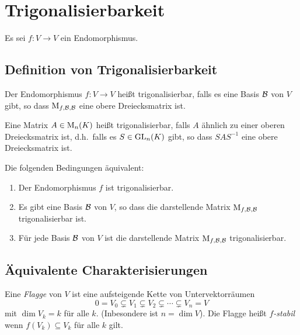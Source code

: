 





\section{Trigonalisierbarkeit}

Es sei $f \colon V \to V$ ein Endomorphismus.



\subsection{Definition von Trigonalisierbarkeit}



\begin{definition}
  Der Endomorphismus $f \colon V \to V$ heißt trigonalisierbar, falls es eine Basis $\mathcal{B}$ von $V$ gibt, so dass $\operatorname{M}_{f, \mathcal{B}, \mathcal{B}}$ eine obere Dreiecksmatrix ist.
  
  Eine Matrix $A \in \operatorname{M}_{n}(K)$ heißt trigonalisierbar, falls $A$ ähnlich zu einer oberen Dreiecksmatrix ist, d.h.\ falls es $S \in \operatorname{GL}_{n}(K)$ gibt, so dass $S A S^{-1}$ eine obere Dreiecksmatrix ist.
\end{definition}

\begin{lemma}
  Die folgenden Bedingungen äquivalent:
  \begin{enumerate}
    \item
      Der Endomorphismus $f$ ist trigonalisierbar.
    \item
      Es gibt eine Basis $\mathcal{B}$ von $V$, so dass die darstellende Matrix $\operatorname{M}_{f, \mathcal{B}, \mathcal{B}}$ trigonalisierbar ist.
    \item
      Für jede Basis $\mathcal{B}$ von $V$ ist die darstellende Matrix $\operatorname{M}_{f, \mathcal{B}, \mathcal{B}}$ trigonalisierbar.
  \end{enumerate}
\end{lemma}



\subsection{Äquivalente Charakterisierungen}

\begin{definition}
  Eine \emph{Flagge} von $V$ ist eine aufsteigende Kette von Untervektorräumen
  \[
                0
    =           V_0
    \subsetneq  V_1
    \subsetneq  V_2
    \subsetneq  \dotsb
    \subsetneq  V_n
    =           V
  \]
  mit $\dim V_k = k$ für alle $k$.
  \textup(Inbesondere ist $n = \dim V$\textup).
  Die Flagge heißt \emph{$f$-stabil} wenn $f(V_k) \subseteq V_k$ für alle $k$ gilt.
\end{definition}

